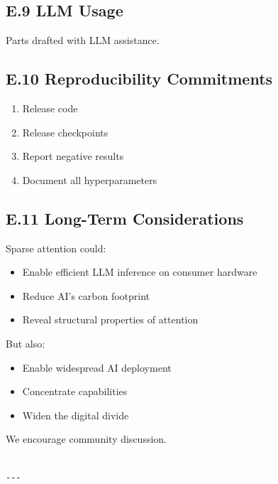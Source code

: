 \subsection{E.9 LLM Usage}

Parts drafted with LLM assistance.

\subsection{E.10 Reproducibility Commitments}

\begin{enumerate}
\item Release code
\item Release checkpoints
\item Report negative results
\item Document all hyperparameters

\end{enumerate}
\subsection{E.11 Long-Term Considerations}

Sparse attention could:

\begin{itemize}
\item Enable efficient LLM inference on consumer hardware
\item Reduce AI's carbon footprint
\item Reveal structural properties of attention

\end{itemize}
But also:

\begin{itemize}
\item Enable widespread AI deployment
\item Concentrate capabilities
\item Widen the digital divide

\end{itemize}
We encourage community discussion.
\begin{lstlisting}

---
\end{lstlisting}